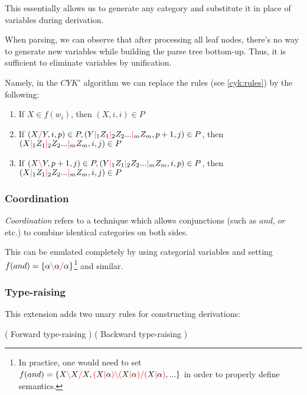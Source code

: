 \documentclass[main.tex]{subfiles}
\begin{document}
This essentially allows us to generate any category and substitute it in place
of variables during derivation.

When parsing, we can observe that after processing all leaf nodes,
there's no way to generate new variables while building the parse tree
bottom-up. Thus, it is sufficient to eliminate variables by unification.

Namely, in the $CYK'$ algorithm we can replace the rules (see \ref{cyk:rules})
by the following:

\begin{enumerate}
    \item If $X \in f(w_i)$, then $(X, i, i) \in P$
    \item If $(X \textcolor{red}{/} Y, i, p) \in P, (Y \textcolor{red}{|}_1 Z_1 \textcolor{red}{|}_2 Z_2 ... \textcolor{red}{|}_m Z_m, p + 1, j) \in P$,
        then $(X \textcolor{red}{|}_1 Z_1 \textcolor{red}{|}_2 Z_2 ... \textcolor{red}{|}_m Z_m, i, j) \in P$
    \item If $(X \textcolor{red}{\backslash} Y, p + 1, j) \in P, (Y \textcolor{red}{|}_1 Z_1 \textcolor{red}{|}_2 Z_2 ... \textcolor{red}{|}_m Z_m, i, p) \in P$,
        then $(X \textcolor{red}{|}_1 Z_1 \textcolor{red}{|}_2 Z_2 ... \textcolor{red}{|}_m Z_m, i, j) \in P$
\end{enumerate}

\subsubsection{Coordination}
\emph{Coordination} refers to a technique which allows conjunctions (such as
$and$, $or$ etc.) to combine identical categories on both sides.

This can be emulated completely by using categorial variables and setting
$f(and) = \{ \alpha \textcolor{red}{\backslash} \alpha \textcolor{red}{/} \alpha \}$\footnote{
    In practice, one would need to set
    $f(and) = \{ X \textcolor{red}{\backslash} X \textcolor{red}{/} X, \textcolor{red}{(} X \textcolor{red}{|} \alpha \textcolor{red}{)} \textcolor{red}{\backslash} \textcolor{red}{(} X \textcolor{red}{|} \alpha \textcolor{red}{)} \textcolor{red}{/} \textcolor{red}{(} X \textcolor{red}{|} \alpha \textcolor{red}{)}, ...\}$
    in order to properly define semantics.
} and similar.

\subsubsection{Type-raising}
This extension adds two unary rules for constructing derivations: \cite[sec.~5.3.1]{nts}
\begin{center}
        ( Forward type-raising )
        ( Backward type-raising )
\end{center}
\end{document}
